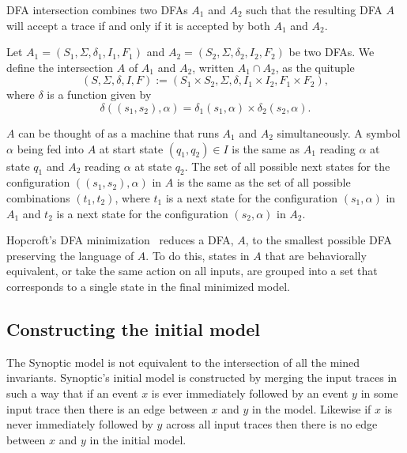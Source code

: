 \begin{definition}
DFA intersection combines two DFAs $A_1$ and $A_2$ such that the resulting DFA $A$ will
accept a trace if and only if it is accepted by both $A_1$ and $A_2$.

Let $A_1=(S_1,\Sigma,\delta_1,I_1,F_1)$ and
$A_2=(S_2,\Sigma,\delta_2,I_2,F_2)$ be two DFAs.
We define the intersection $A$ of $A_1$ and $A_2$, written $A_1\cap A_2$, as the quituple
$$(S,\Sigma,\delta,I,F):=(S_1\times S_2,\Sigma,\delta, I_1\times I_2, F_1\times F_2),$$
where $\delta$ is a function
given by $$\delta((s_1,s_2),\alpha)=\delta_1(s_1,\alpha)\times \delta_2(s_2,\alpha).$$

$A$ can be thought of as a machine that runs
$A_1$ and $A_2$ simultaneously. A symbol $\alpha$ being fed into $A$ at start state $(q_1,q_2)\in I$
is the same as $A_1$ reading $\alpha$ at state $q_1$ and $A_2$ reading $\alpha$ at state $q_2$. The
set of all possible next states for the configuration $((s_1,s_2),\alpha)$ in $A$ is the same as the
set of all possible combinations $(t_1,t_2)$, where $t_1$ is a next state for the configuration
$(s_1,\alpha)$ in $A_1$ and $t_2$ is a next state for the configuration $(s_2,\alpha)$ in $A_2$.
\end{definition}

\begin{definition}
Hopcroft's DFA minimization~\cite{hopcroft_minimization_tr1971} 
reduces a DFA, $A$, to the smallest possible DFA
preserving the language of $A$.
To do this, states in $A$ that are
behaviorally equivalent, or take the same action on all inputs, are grouped into
a set that corresponds to a single state in the final minimized model.

\end{definition}

\subsection{Constructing the initial model}
The Synoptic model is not equivalent to the intersection of all the mined
invariants. Synoptic's initial model is constructed by merging the input traces in such a
way that if an event $x$ is ever immediately followed by an event $y$ in some input trace
then there is an edge between $x$ and $y$ in the model. Likewise
if $x$ is never immediately followed by $y$ across all input traces
then there is no edge between $x$ and $y$ in the initial model.

